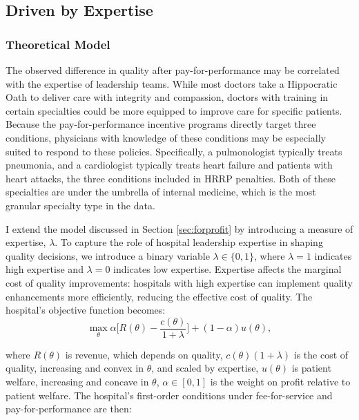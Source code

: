 \documentclass[12pt]{article}
\begin{document}
    \subsection{Driven by Expertise}\label{sec:expertise}

    \subsubsection{Theoretical Model}

    The observed difference in quality after pay-for-performance may be correlated with the expertise of leadership teams. While most doctors take a Hippocratic Oath to deliver care with integrity and compassion, doctors with training in certain specialties could be more equipped to improve care for specific patients. Because the pay-for-performance incentive programs directly target three conditions, physicians with knowledge of these conditions may be especially suited to respond to these policies. Specifically, a pulmonologist typically treats pneumonia, and a cardiologist typically treats heart failure and patients with heart attacks, the three conditions included in HRRP penalties. Both of these specialties are under the umbrella of internal medicine, which is the most granular specialty type in the data. 
    
    I extend the model discussed in Section \ref{sec:forprofit} by introducing a measure of expertise, $\lambda$. To capture the role of hospital leadership expertise in shaping quality decisions, we introduce a binary variable $\lambda \in \{0,1\}$, where $\lambda=1$ indicates high expertise and $\lambda=0$ indicates low expertise. Expertise affects the marginal cost of quality improvements: hospitals with high expertise can implement quality enhancements more efficiently, reducing the effective cost of quality. The hospital’s objective function becomes:
    \begin{equation}
        \max_{\theta} \alpha \big[R(\theta) - \frac{c(\theta)}{1+\lambda}\big] + (1 - \alpha) u(\theta),
    \end{equation}

    \noindent where $R(\theta)$ is revenue, which depends on quality,
    $c(\theta)(1 + \lambda)$ is the cost of quality, increasing and convex in $\theta$, and scaled by expertise, $u(\theta)$ is patient welfare, increasing and concave in $\theta$, $\alpha \in [0,1]$ is the weight on profit relative to patient welfare. The hospital's first-order conditions under fee-for-service and pay-for-performance are then:
\end{document}
